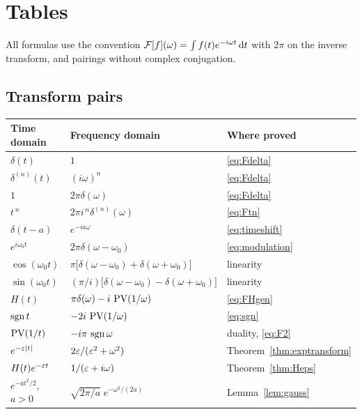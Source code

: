 \appendix

\chapter{Tables}
\label{app:tables}

All formulas use the convention
$\mathcal{F}[f](\omega)=\int f(t)e^{-i\omega t}\,\mathrm{d} t$ with $2\pi$ on the inverse transform, and pairings
without complex conjugation.

\section{Transform pairs}

\begin{center}
\small
\begin{tabular}{@{}lll@{}}
\toprule
Time domain & Frequency domain & Where proved \\
\midrule
$\delta(t)$ & $1$ & \eqref{eq:Fdelta} \\
$\delta^{(n)}(t)$ & $(i\omega)^{n}$ & \eqref{eq:Fdelta} \\
$1$ & $2\pi\delta(\omega)$ & \eqref{eq:Fdelta} \\
$t^{\,n}$ & $2\pi i^{\,n}\delta^{(n)}(\omega)$ & \eqref{eq:Ftn} \\
$\delta(t-a)$ & $e^{-ia\omega}$ & \eqref{eq:timeshift} \\
$e^{i\omega_{0}t}$ & $2\pi\delta(\omega-\omega_{0})$ & \eqref{eq:modulation} \\
$\cos(\omega_{0}t)$ & $\pi\big[\delta(\omega-\omega_{0})+\delta(\omega+\omega_{0})\big]$ & linearity \\
$\sin(\omega_{0}t)$ & $(\pi/i)\big[\delta(\omega-\omega_{0})-\delta(\omega+\omega_{0})\big]$ & linearity \\
$H(t)$ & $\pi\delta(\omega)-i\,\operatorname{PV}(1/\omega)$ & \eqref{eq:FHgen} \\
$\operatorname{sgn} t$ & $-2i\,\operatorname{PV}(1/\omega)$ & \eqref{eq:sgn} \\
$\operatorname{PV}(1/t)$ & $-i\pi\,\operatorname{sgn}\omega$ & duality, \eqref{eq:F2} \\
$e^{-\varepsilon|t|}$ & $2\varepsilon/(\varepsilon^{2}+\omega^{2})$ & Theorem~\ref{thm:exptransform} \\
$H(t)e^{-\varepsilon t}$ & $1/(\varepsilon+i\omega)$ & Theorem~\ref{thm:Heps} \\
$e^{-at^{2}/2}$, $a>0$ & $\sqrt{2\pi/a}\;e^{-\omega^{2}/(2a)}$ & Lemma~\ref{lem:gauss} \\
\bottomrule
\end{tabular}
\end{center}

